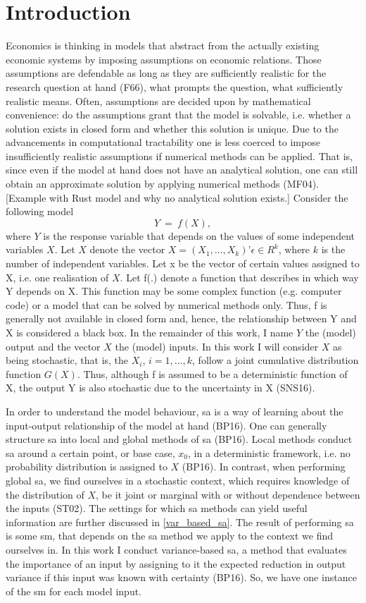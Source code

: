 \section{Introduction} \label{intro}

Economics is thinking in models that abstract from the actually existing economic systems by imposing assumptions on economic relations. Those assumptions are defendable as long as they are sufficiently realistic for the research question at hand (F66), what prompts the question, what sufficiently realistic means. Often, assumptions are decided upon by mathematical convenience: do the assumptions grant that the model is solvable, i.e. whether a solution exists in closed form and whether this solution is unique.
Due to the advancements in computational tractability one is less coerced to impose insufficiently realistic assumptions if numerical methods can be applied. That is, since even if the model at hand does not have an analytical solution, one can still obtain an approximate solution by applying numerical methods (MF04). [Example with Rust model and why no analytical solution exists.]
Consider the following model
$$Y\ =\ f(X),$$
where $Y$ is the response variable that depends on the values of some independent variables $X$. Let $X$ denote the vector $X = (X_1, …, X_k)’ \epsilon \in R^k$, where $k$ is the number of independent variables. Let x be the vector of certain values assigned to X, i.e. one realisation of $X$. Let f(.) denote a function that describes in which way Y depends on X. This function may be some complex function (e.g. computer code) or a model that can be solved by numerical methods only. Thus, f is generally not available in closed form and, hence, the relationship between Y and X is considered a black box.
In the remainder of this work, I name $Y$ the (model) output and the vector $X$ the (model) inputs. In this work I will consider $X$ as being stochastic, that is, the $X_i$, $i = 1, …, k$, follow a joint cumulative distribution function $G(X)$. Thus, although f is assumed to be a deterministic function of X, the output Y is also stochastic due to the uncertainty in X (SNS16).

In order to understand the model behaviour, sa is a way of learning about the input-output relationship of the model at hand (BP16). One can generally structure sa into local and global methods of sa (BP16). Local methods conduct sa around a certain point, or base case, $x_0$, in a deterministic framework, i.e. no probability distribution is assigned to $X$ (BP16). In contrast, when performing global sa, we find ourselves in a stochastic context, which requires knowledge of the distribution of $X$, be it joint or marginal with or without dependence between the inputs (ST02).
The settings for which sa methods can yield useful information are further discussed in \cref{var_based_sa}. The result of performing sa is some sm, that depends on the sa method we apply to the context we find ourselves in. In this work I conduct variance-based sa, a method that evaluates the importance of an input by assigning to it the expected reduction in output variance if this input was known with certainty (BP16). So, we have one instance of the sm for each model input.

